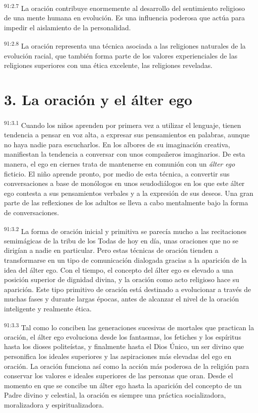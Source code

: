 \par
\textsuperscript{91:2.7} La oración contribuye enormemente al desarrollo del sentimiento religioso de una mente humana en evolución. Es una influencia poderosa que actúa para impedir el aislamiento de la personalidad.

\par
\textsuperscript{91:2.8} La oración representa una técnica asociada a las religiones naturales de la evolución racial, que también forma parte de los valores experienciales de las religiones superiores con una ética excelente, las religiones reveladas.

\section*{3. La oración y el álter ego}
\par
\textsuperscript{91:3.1} Cuando los niños aprenden por primera vez a utilizar el lenguaje, tienen tendencia a pensar en voz alta, a expresar sus pensamientos en palabras, aunque no haya nadie para escucharlos. En los albores de su imaginación creativa, manifiestan la tendencia a conversar con unos compañeros imaginarios. De esta manera, el ego en ciernes trata de mantenerse en comunión con un \textit{álter ego} ficticio. El niño aprende pronto, por medio de esta técnica, a convertir sus conversaciones a base de monólogos en unos seudodiálogos en los que este álter ego contesta a sus pensamientos verbales y a la expresión de sus deseos. Una gran parte de las reflexiones de los adultos se lleva a cabo mentalmente bajo la forma de conversaciones.

\par
\textsuperscript{91:3.2} La forma de oración inicial y primitiva se parecía mucho a las recitaciones semimágicas de la tribu de los Todas de hoy en día, unas oraciones que no se dirigían a nadie en particular. Pero estas técnicas de oración tienden a transformarse en un tipo de comunicación dialogada gracias a la aparición de la idea del álter ego. Con el tiempo, el concepto del álter ego es elevado a una posición superior de dignidad divina, y la oración como acto religioso hace su aparición. Este tipo primitivo de oración está destinado a evolucionar a través de muchas fases y durante largas épocas, antes de alcanzar el nivel de la oración inteligente y realmente ética.

\par
\textsuperscript{91:3.3} Tal como lo conciben las generaciones sucesivas de mortales que practican la oración, el álter ego evoluciona desde los fantasmas, los fetiches y los espíritus hasta los dioses politeístas, y finalmente hasta el Dios Único, un ser divino que personifica los ideales superiores y las aspiraciones más elevadas del ego en oración. La oración funciona así como la acción más poderosa de la religión para conservar los valores e ideales superiores de las personas que oran. Desde el momento en que se concibe un álter ego hasta la aparición del concepto de un Padre divino y celestial, la oración es siempre una práctica socializadora, moralizadora y espiritualizadora.

